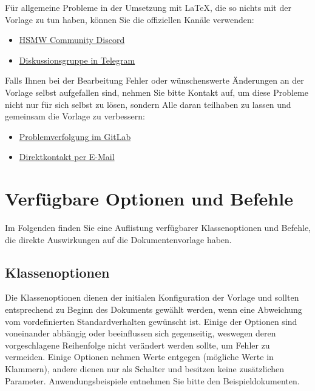 	Für allgemeine Probleme in der Umsetzung mit LaTeX, die so nichts mit der Vorlage zu tun haben, können Sie die offiziellen Kanäle verwenden:
	\begin{itemize}
		\item \href{https://discord.com/channels/750860384126369822/765215969424834600}{HSMW Community Discord}
		\item \href{https://t.me/joinchat/Bxm0glfyeKXTM9OVlAhzJw}{Diskussionsgruppe in Telegram}
	\end{itemize}
	
	Falls Ihnen bei der Bearbeitung Fehler oder wünschenswerte Änderungen an der Vorlage selbst aufgefallen sind, nehmen Sie bitte Kontakt auf, um diese Probleme nicht nur für sich selbst zu lösen, sondern Alle daran teilhaben zu lassen und gemeinsam die Vorlage zu verbessern:
	\begin{itemize}
		\item \href{https://git.hs-mittweida.de/hsmw-latex/hsmw-thesis/-/issues}{Problemverfolgung im GitLab}
		\item \href{mailto:schildba@hs-mittweida.de?subject=[LaTeX] Vorlage Abschlussarbeiten}{Direktkontakt per E-Mail}
	\end{itemize}
	
	
	
	\chapter{Verfügbare Optionen und Befehle}
	\label{cha:optionsAndCommands}
	
	Im Folgenden finden Sie eine Auflistung verfügbarer Klassenoptionen und Befehle, die direkte Auswirkungen auf die Dokumentenvorlage haben.
	
	\section{Klassenoptionen}
	
	Die Klassenoptionen dienen der initialen Konfiguration der Vorlage und sollten entsprechend zu Beginn des Dokuments gewählt werden, wenn eine Abweichung vom vordefinierten Standardverhalten gewünscht ist.
	Einige der Optionen sind voneinander abhängig oder beeinflussen sich gegenseitig, weswegen deren vorgeschlagene Reihenfolge nicht verändert werden sollte, um Fehler zu vermeiden.
	Einige Optionen nehmen Werte entgegen (mögliche Werte in Klammern), andere dienen nur als Schalter und besitzen keine zusätzlichen Parameter.
	Anwendungsbeispiele entnehmen Sie bitte den Beispieldokumenten.
	
